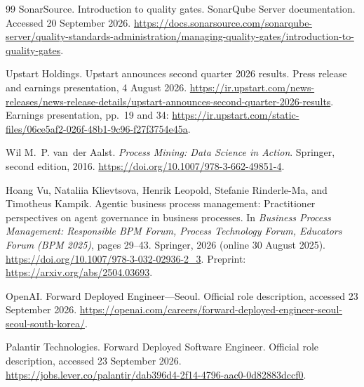 \begin{thebibliography}{99}
SonarSource.
\newblock Introduction to quality gates. SonarQube Server documentation.
\newblock Accessed 20 September 2026.
\newblock \url{https://docs.sonarsource.com/sonarqube-server/quality-standards-administration/managing-quality-gates/introduction-to-quality-gates}.

Upstart Holdings.
\newblock Upstart announces second quarter 2026 results.
\newblock Press release and earnings presentation, 4 August 2026.
\newblock \url{https://ir.upstart.com/news-releases/news-release-details/upstart-announces-second-quarter-2026-results}.
\newblock Earnings presentation, pp.~19 and 34:
\url{https://ir.upstart.com/static-files/06ce5af2-026f-48b1-9c96-f27f3754e45a}.

Wil M.~P. van~der Aalst.
\newblock \emph{Process Mining: Data Science in Action}.
\newblock Springer, second edition, 2016.
\newblock \url{https://doi.org/10.1007/978-3-662-49851-4}.

Hoang Vu, Nataliia Klievtsova, Henrik Leopold, Stefanie Rinderle-Ma, and Timotheus Kampik.
\newblock Agentic business process management: Practitioner perspectives on agent governance in business processes.
\newblock In \emph{Business Process Management: Responsible BPM Forum, Process Technology Forum, Educators Forum (BPM 2025)}, pages 29--43. Springer, 2026 (online 30 August 2025).
\newblock \url{https://doi.org/10.1007/978-3-032-02936-2_3}. Preprint: \url{https://arxiv.org/abs/2504.03693}.

OpenAI.
\newblock Forward Deployed Engineer---Seoul.
\newblock Official role description, accessed 23 September 2026.
\newblock \url{https://openai.com/careers/forward-deployed-engineer-seoul-seoul-south-korea/}.

Palantir Technologies.
\newblock Forward Deployed Software Engineer.
\newblock Official role description, accessed 23 September 2026.
\newblock \url{https://jobs.lever.co/palantir/dab396d4-2f14-4796-aac0-0d82883dccf0}.

\end{thebibliography}
\endgroup
